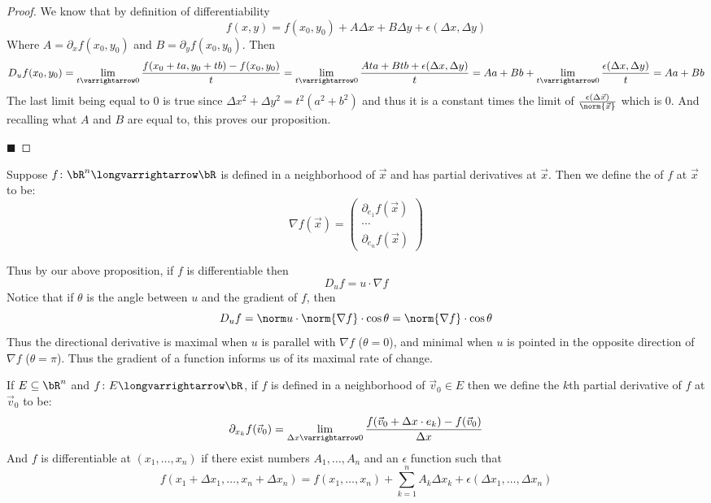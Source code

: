 \documentclass[10pt]{article}
\begin{document}
\begin{proof}

    We know that by definition of differentiability
    \[ f(x,y) = f(x_0,y_0) + A\Delta x + B\Delta y + \epsilon(\Delta x,\Delta y) \]
    Where $A=\partial_x f(x_0,y_0)$ and $B=\partial_y f(x_0,y_0)$.
    Then
    \[ D_u f(x_0,y_0) = \lim_{t\varrightarrow0}\frac{f(x_0+ta, y_0+tb) - f(x_0,y_0)}t = \lim_{t\varrightarrow0}\frac{Ata + Btb + \epsilon(\Delta x,\Delta y)}t =
    Aa + Bb + \lim_{t\varrightarrow0}\frac{\epsilon(\Delta x,\Delta y)}t = Aa + Bb \]
    The last limit being equal to $0$ is true since $\Delta x^2+\Delta y^2=t^2(a^2+b^2)$ and thus it is a constant times the limit of $\frac{\epsilon(\Delta\vec x)}{\norm{\vec x}}$ which is $0$.
    And recalling what $A$ and $B$ are equal to, this proves our proposition.

    \hfill$\blacksquare$

\end{proof}

\begin{defn*}

    Suppose $f\colon\bR^n\longvarrightarrow\bR$ is defined in a neighborhood of $\vec x$ and has partial derivatives at $\vec x$.
    Then we define the  of $f$ at $\vec x$ to be:
    \[ \nabla f(\vec x) = \begin{pmatrix} \partial_{e_1} f(\vec x) \\ \cdots \\ \partial_{e_n} f(\vec x) \end{pmatrix} \]

\end{defn*}

Thus by our above proposition, if $f$ is differentiable then
\[ D_uf = u\cdot\nabla f \]
Notice that if $\theta$ is the angle between $u$ and the gradient of $f$, then
\[ D_uf = \norm u\cdot\norm{\nabla f}\cdot\cos\theta  = \norm{\nabla f}\cdot\cos\theta \]
Thus the directional derivative is maximal when $u$ is parallel with $\nabla f$ ($\theta=0$), and minimal when $u$ is pointed in the opposite direction of $\nabla f$ ($\theta=\pi$).
Thus the gradient of a function informs us of its maximal rate of change.

\begin{defn*}

    If $E\subseteq\bR^n$ and $f\colon E\longvarrightarrow\bR$, if $f$ is defined in a neighborhood of $\vec v_0\in E$ then we define the $k$th partial derivative of $f$ at $\vec v_0$ to be:
    \[ \partial_{x_k} f(\vec v_0) = \lim_{\Delta x\varrightarrow0}\frac{f(\vec v_0 + \Delta x\cdot e_k) - f(\vec v_0)}{\Delta x} \]
    And $f$ is differentiable at $(x_1,\dots,x_n)$ if there exist numbers $A_1,\dots,A_n$ and an $\epsilon$ function such that
    \[ f(x_1+\Delta x_1,\dots,x_n+\Delta x_n) = f(x_1,\dots,x_n) + \sum_{k=1}^n A_k\Delta x_k + \epsilon(\Delta x_1,\dots,\Delta x_n) \]

\end{defn*}
\end{document}
